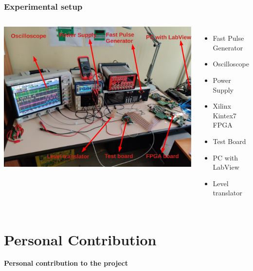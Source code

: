 \documentclass[aspectratio=169]{beamer}
\begin{document}
	\begin{frame}
	\frametitle{Experimental setup}
		\begin{columns}
			\begin{center}
				\includegraphics[width=0.95 \textwidth]{IMG/TestBench.pdf}
			\end{center}
			\begin{itemize}
				\item Fast Pulse Generator
				\item Oscilloscope
				\item Power Supply
				\item Xilinx Kintex7 FPGA
				\item Test Board
				\item PC with LabView
				\item Level translator
			\end{itemize}
		\end{columns}
		
	\end{frame}



	\section{Personal Contribution}
	
	\begin{frame}
		\begin{center}
			{\Huge {}\selectfont \color{blue} \textbf{Personal contribution to the project}}
		\end{center}
	\end{frame}
	
\end{document}
